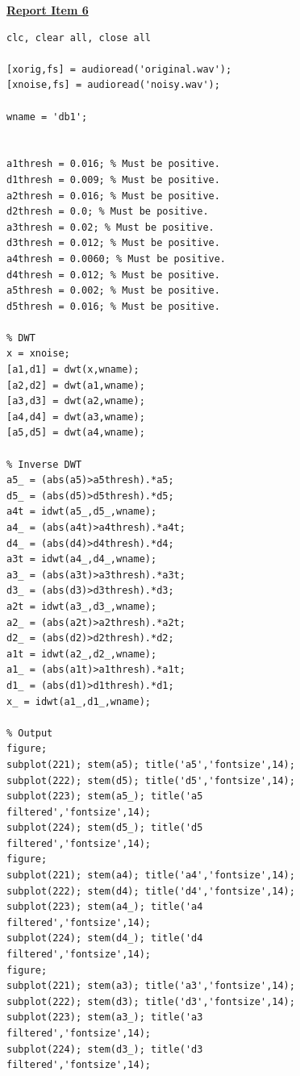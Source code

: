 \documentclass{article}
\begin{document}
\begin{figure}[H]
\color{red}
\underline{\textbf{Report Item 6}}
\color{black}
\begin{lstlisting}
clc, clear all, close all

[xorig,fs] = audioread('original.wav');
[xnoise,fs] = audioread('noisy.wav');

wname = 'db1';


a1thresh = 0.016; % Must be positive.
d1thresh = 0.009; % Must be positive.
a2thresh = 0.016; % Must be positive.
d2thresh = 0.0; % Must be positive.
a3thresh = 0.02; % Must be positive.
d3thresh = 0.012; % Must be positive.
a4thresh = 0.0060; % Must be positive.
d4thresh = 0.012; % Must be positive.
a5thresh = 0.002; % Must be positive.
d5thresh = 0.016; % Must be positive.

% DWT
x = xnoise;
[a1,d1] = dwt(x,wname);
[a2,d2] = dwt(a1,wname);
[a3,d3] = dwt(a2,wname);
[a4,d4] = dwt(a3,wname);
[a5,d5] = dwt(a4,wname);

% Inverse DWT
a5_ = (abs(a5)>a5thresh).*a5;
d5_ = (abs(d5)>d5thresh).*d5;
a4t = idwt(a5_,d5_,wname);
a4_ = (abs(a4t)>a4thresh).*a4t;
d4_ = (abs(d4)>d4thresh).*d4;
a3t = idwt(a4_,d4_,wname);
a3_ = (abs(a3t)>a3thresh).*a3t;
d3_ = (abs(d3)>d3thresh).*d3;
a2t = idwt(a3_,d3_,wname);
a2_ = (abs(a2t)>a2thresh).*a2t;
d2_ = (abs(d2)>d2thresh).*d2;
a1t = idwt(a2_,d2_,wname);
a1_ = (abs(a1t)>a1thresh).*a1t;
d1_ = (abs(d1)>d1thresh).*d1;
x_ = idwt(a1_,d1_,wname);

% Output
figure;
subplot(221); stem(a5); title('a5','fontsize',14);
subplot(222); stem(d5); title('d5','fontsize',14);
subplot(223); stem(a5_); title('a5 filtered','fontsize',14);
subplot(224); stem(d5_); title('d5 filtered','fontsize',14);
figure;
subplot(221); stem(a4); title('a4','fontsize',14);
subplot(222); stem(d4); title('d4','fontsize',14);
subplot(223); stem(a4_); title('a4 filtered','fontsize',14);
subplot(224); stem(d4_); title('d4 filtered','fontsize',14);
figure;
subplot(221); stem(a3); title('a3','fontsize',14);
subplot(222); stem(d3); title('d3','fontsize',14);
subplot(223); stem(a3_); title('a3 filtered','fontsize',14);
subplot(224); stem(d3_); title('d3 filtered','fontsize',14);

\end{lstlisting}
\end{figure}
\end{document}
